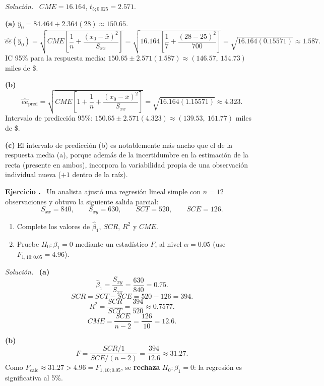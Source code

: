 \documentclass[11pt,a4paper]{article}
\newcounter{ejnum}
\newenvironment{ejercicio}{\refstepcounter{ejnum}\par\medskip\noindent\textbf{Ejercicio \theejnum.}~}{\par}
\newenvironment{solucion}{\par\noindent\textit{Solución.}~}{\par\vspace{1em}}
\begin{document}
\begin{solucion}
$CME=16.164$, $t_{5;0.025}=2.571$.

\textbf{(a)} $\hat y_0 = 84.464+2.364(28)\approx150.65$.
\[
\widehat{ee}(\hat y_0)=\sqrt{CME\left[\frac1n+\frac{(x_0-\bar x)^2}{S_{xx}}\right]}=\sqrt{16.164\left[\frac17+\frac{(28-25)^2}{700}\right]}=\sqrt{16.164(0.15571)}\approx1.587.
\]
IC 95\% para la respuesta media: $150.65\pm2.571(1.587) \approx (146.57,\ 154.73)$ miles de \$.

\textbf{(b)}
\[
\widehat{ee}_{\text{pred}}=\sqrt{CME\left[1+\frac1n+\frac{(x_0-\bar x)^2}{S_{xx}}\right]}=\sqrt{16.164(1.15571)}\approx4.323.
\]
Intervalo de predicción 95\%: $150.65\pm2.571(4.323)\approx(139.53,\ 161.77)$ miles de \$.

\textbf{(c)} El intervalo de predicción (b) es notablemente más ancho que el de la respuesta media (a), porque además de la incertidumbre en la estimación de la recta (presente en ambos), incorpora la variabilidad propia de una observación individual nueva ($+1$ dentro de la raíz).
\end{solucion}

\begin{ejercicio}
Un analista ajustó una regresión lineal simple con $n=12$ observaciones y obtuvo la siguiente salida parcial:
\[
S_{xx}=840, \qquad S_{xy}=630, \qquad SCT=520, \qquad SCE=126.
\]
\begin{enumerate}[label=(\alph*)]
\item Complete los valores de $\hat\beta_1$, $SCR$, $R^2$ y $CME$.
\item Pruebe $H_0:\beta_1=0$ mediante un estadístico $F$, al nivel $\alpha=0.05$ (use $F_{1,10;0.05}=4.96$).
\end{enumerate}
\end{ejercicio}

\begin{solucion}
\textbf{(a)}
\[
\hat\beta_1=\frac{S_{xy}}{S_{xx}}=\frac{630}{840}=0.75.
\]
\[
SCR = SCT-SCE = 520-126=394.
\]
\[
R^2=\frac{SCR}{SCT}=\frac{394}{520}\approx0.7577.
\]
\[
CME=\frac{SCE}{n-2}=\frac{126}{10}=12.6.
\]

\textbf{(b)}
\[
F=\frac{SCR/1}{SCE/(n-2)}=\frac{394}{12.6}\approx31.27.
\]
Como $F_{\text{calc}}\approx31.27 > 4.96=F_{1,10;0.05}$, se \textbf{rechaza} $H_0:\beta_1=0$: la regresión es significativa al 5\%.
\end{solucion}
\end{document}
